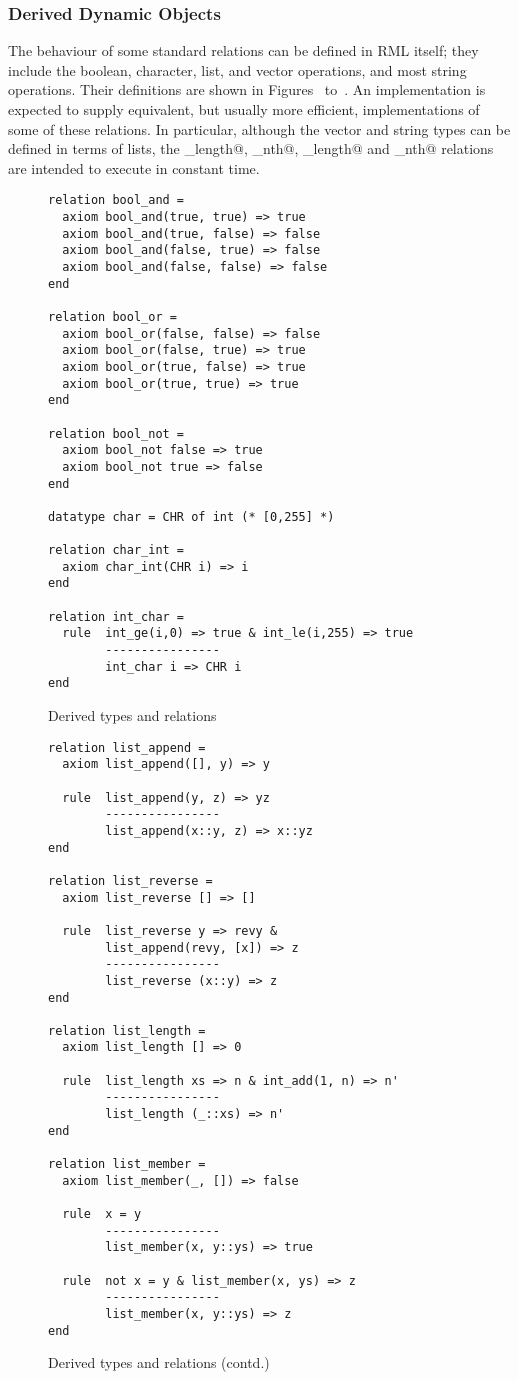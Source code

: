 \subsubsection{Derived Dynamic Objects}
The behaviour of some standard relations can be defined in RML itself; they include
the boolean, character, list, and vector operations, and most string operations.
Their definitions are shown in Figures~
to~.
An implementation is expected to supply equivalent, but usually more efficient,
implementations of some of these relations.
In particular, although the vector and string types can be defined in terms of lists,
the \verb@vector_length@, \verb@vector_nth@, \verb@string_length@ and
\verb@string_nth@ relations are intended to execute in constant time.
%
\begin{figure}[htbp]
\begin{verbatim}
relation bool_and =
  axiom bool_and(true, true) => true
  axiom bool_and(true, false) => false
  axiom bool_and(false, true) => false
  axiom bool_and(false, false) => false
end

relation bool_or =
  axiom bool_or(false, false) => false
  axiom bool_or(false, true) => true
  axiom bool_or(true, false) => true
  axiom bool_or(true, true) => true
end

relation bool_not =
  axiom bool_not false => true
  axiom bool_not true => false
end

datatype char = CHR of int (* [0,255] *)

relation char_int =
  axiom char_int(CHR i) => i
end

relation int_char =
  rule  int_ge(i,0) => true & int_le(i,255) => true
        ----------------
        int_char i => CHR i
end
\end{verbatim}
\caption{Derived types and relations}
\end{figure}
%
\begin{figure}[htbp]
\begin{verbatim}
relation list_append =
  axiom list_append([], y) => y

  rule  list_append(y, z) => yz
        ----------------
        list_append(x::y, z) => x::yz
end

relation list_reverse =
  axiom list_reverse [] => []

  rule  list_reverse y => revy &
        list_append(revy, [x]) => z
        ----------------
        list_reverse (x::y) => z
end

relation list_length =
  axiom list_length [] => 0

  rule  list_length xs => n & int_add(1, n) => n'
        ----------------
        list_length (_::xs) => n'
end

relation list_member =
  axiom list_member(_, []) => false

  rule  x = y
        ----------------
        list_member(x, y::ys) => true

  rule  not x = y & list_member(x, ys) => z
        ----------------
        list_member(x, y::ys) => z
end
\end{verbatim}
\caption{Derived types and relations (contd.)}
\end{figure}

